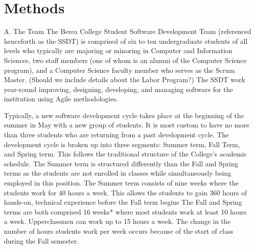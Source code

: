 \section{Methods}
A.   The Team
The Berea College Student Software Development Team (referenced henceforth as the SSDT) is comprised of six to ten undergraduate students of all levels who typically are majoring or minoring in Computer and Information Sciences, two staff members (one of whom is an alumni of the Computer Science program), and a Computer Science faculty member who serves as the Scrum Master. (Should we include details about the Labor Program?) The SSDT work year-round improving, designing, developing, and managing software for the institution using Agile methodologies.

Typically, a new software development cycle takes place at the beginning of the summer in May with a new group of students. It is most custom to have no more than three students who are returning from a past development cycle. The development cycle is broken up into three segments: Summer term, Fall Term, and Spring term. This follows the traditional structure of the College's academic schedule. The Summer term is structured differently than the Fall and Spring terms as the students are not enrolled in classes while simultaneously being employed in this position. The Summer term consists of nine weeks where the students work for 40 hours a week. This allows the students to gain 360 hours of hands-on, technical experience before the Fall term begins The Fall and Spring terms are both comprised 16 weeks* where most students work at least 10 hours a week. Upperclassmen can work up to 15 hours a week. The change in the number of hours students work per week occurs because of the start of class during the Fall semester.

